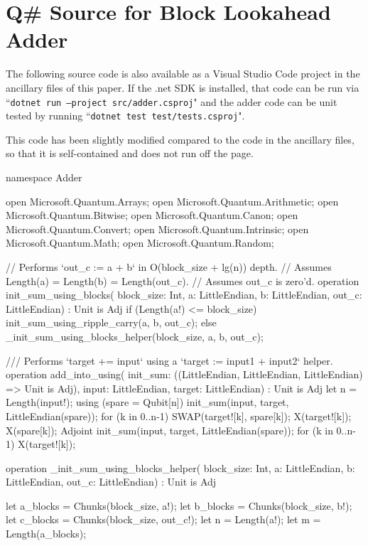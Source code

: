 \documentclass[onecolumn,unpublished]{quantumarticle}
\theoremstyle{definition}
\theoremstyle{definition}
\theoremstyle{definition}
\begin{document}
\section{Q\# Source for Block Lookahead Adder}
\label{app:blockadder}

The following source code is also available as a Visual Studio Code project in the ancillary files of this paper.
If the .net SDK is installed, that code can be run via ``\texttt{dotnet run --project src/adder.csproj}" and the adder code can be unit tested by running ``\texttt{dotnet test test/tests.csproj}".

This code has been slightly modified compared to the code in the ancillary files, so that it is self-contained and does not run off the page.

\begin{qsharp}
namespace Adder {
    open Microsoft.Quantum.Arrays;
    open Microsoft.Quantum.Arithmetic;
    open Microsoft.Quantum.Bitwise;
    open Microsoft.Quantum.Canon;
    open Microsoft.Quantum.Convert;
    open Microsoft.Quantum.Intrinsic;
    open Microsoft.Quantum.Math;
    open Microsoft.Quantum.Random;

    // Performs `out_c := a + b` in O(block_size + lg(n)) depth.
    // Assumes Length(a) = Length(b) = Length(out_c).
    // Assumes out_c is zero'd.
    operation init_sum_using_blocks(
            block_size: Int,
            a: LittleEndian,
            b: LittleEndian,
            out_c: LittleEndian) : Unit is Adj {
        if (Length(a!) <= block_size) {
            init_sum_using_ripple_carry(a, b, out_c);
        } else {
            _init_sum_using_blocks_helper(block_size, a, b, out_c);
        }
    }

    /// Performs `target += input` using a `target := input1 + input2` helper.
    operation add_into_using(
            init_sum: ((LittleEndian, LittleEndian, LittleEndian) => Unit is Adj),
            input: LittleEndian,
            target: LittleEndian) : Unit is Adj {
        let n = Length(input!);
        using (spare = Qubit[n]) {
            init_sum(input, target, LittleEndian(spare));
            for (k in 0..n-1) {
                SWAP(target![k], spare[k]);
                X(target![k]);
                X(spare[k]);
            }
            Adjoint init_sum(input, target, LittleEndian(spare));
            for (k in 0..n-1) {
                X(target![k]);
            }
        }
    }

    operation _init_sum_using_blocks_helper(
            block_size: Int,
            a: LittleEndian,
            b: LittleEndian,
            out_c: LittleEndian) : Unit is Adj {
        let a_blocks = Chunks(block_size, a!);
        let b_blocks = Chunks(block_size, b!);
        let c_blocks = Chunks(block_size, out_c!);
        let n = Length(a!);
        let m = Length(a_blocks);

}}
\end{qsharp}
\end{document}

